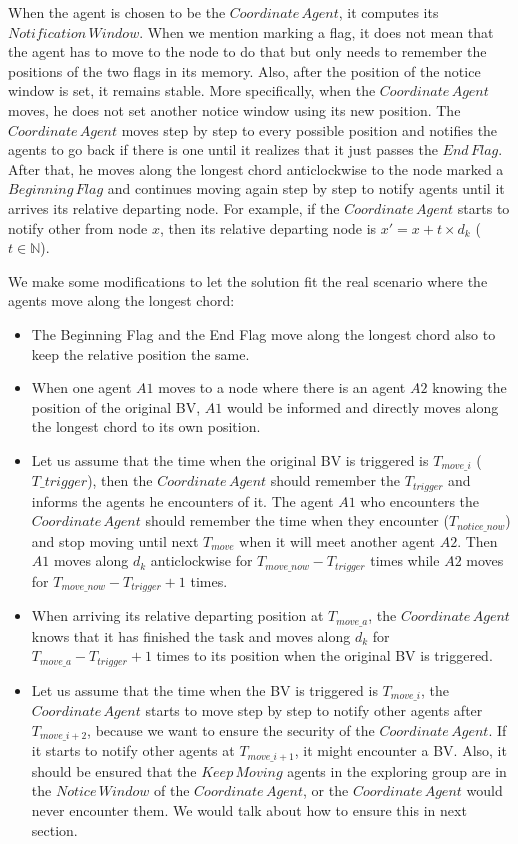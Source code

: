 \documentclass[conference]{IEEEtran}
\begin{document}
When the agent is chosen to be the $Coordinate\,Agent$, it computes its $Notification\,Window$. When we mention marking a flag, it does not mean that the agent has to move to the node to do that but only needs to remember the positions of the two flags in its memory. Also, after the position of the notice window is set, it remains stable. More specifically, when the $Coordinate\,Agent$ moves, he does not set another notice window using its new position. The $Coordinate\,Agent$ moves step by step to every possible position and notifies the agents to go back if there is one until it realizes that it just passes the $End\,Flag$. After that, he moves along the longest chord anticlockwise to the node marked a $Beginning\,Flag$ and continues moving again step by step to notify agents until it arrives its relative departing node. For example, if the $Coordinate\,Agent$ starts to notify other from node $x$, then its relative departing node is $x'=x+t\times{d_k}$ ($t\in \mathbb{N}$).

We make some modifications to let the solution fit the real scenario where the agents move along the longest chord: 
\begin{itemize}
\item The Beginning Flag and the End Flag move along the longest chord also to keep the relative position the same. 
\item  When one agent $A1$ moves to a node where there is an agent $A2$ knowing the position of the original BV, $A1$ would be informed and directly moves along the longest chord to its own position. 
\item  Let us assume that the time when the original BV is triggered is $T_{move\_i}$ ($T\_{trigger}$), then the $Coordinate\,Agent$ should remember the $T_{trigger}$ and informs the agents he encounters of it. The agent $A1$ who encounters the $Coordinate\,Agent$ should remember the time when they encounter ($T_{notice\_now}$) and stop moving until next $T_{move}$ when it will meet another agent $A2$. Then $A1$ moves along $d_k$ anticlockwise for $T_{move\_now}-T_{trigger}$ times while $A2$ moves for $T_{move\_now}-T_{trigger}+1$ times. 
\item When arriving its relative departing position at $T_{move\_a}$, the $Coordinate\,Agent$ knows that it has finished the task and moves along $d_k$ for $T_{move\_a}- T_{trigger}+1$ times to its position when the original BV is triggered.
\item Let us assume that the time when the BV is triggered is $T_{move\_i}$, the $Coordinate\,Agent$ starts to move step by step to notify other agents after $T_{move\_{i+2}}$, because we want to ensure the security of the $Coordinate\,Agent$. If it starts to notify other agents at $T_{move\_{i+1}}$, it might encounter a BV. Also, it should be ensured that the $Keep\,Moving$ agents in the exploring group are in the $Notice\,Window$ of the $Coordinate\,Agent$, or the $Coordinate\,Agent$ would never encounter them. We would talk about how to ensure this in next section.
\end{itemize} 
\end{document}
